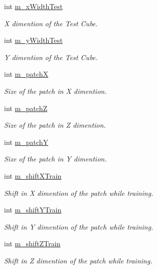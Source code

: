 \begin{DoxyCompactItemize}
int \hyperlink{classDataReader_a3b70edeb59564609bc13d11761586225}{m\+\_\+x\+Width\+Test}
\begin{DoxyCompactList}\small\item\em X dimention of the Test Cube. \end{DoxyCompactList}\item 
int \hyperlink{classDataReader_ac8debe3d06ff92d1d57e90bb5d18a812}{m\+\_\+y\+Width\+Test}
\begin{DoxyCompactList}\small\item\em Y dimention of the Test Cube. \end{DoxyCompactList}\item 
int \hyperlink{classDataReader_a95d075ccc3b12ec30a97d6664642efc2}{m\+\_\+patchX}
\begin{DoxyCompactList}\small\item\em Size of the patch in X dimention. \end{DoxyCompactList}\item 
int \hyperlink{classDataReader_a68b54683e0e0581e3dd76874ea5b6941}{m\+\_\+patchZ}
\begin{DoxyCompactList}\small\item\em Size of the patch in Z dimention. \end{DoxyCompactList}\item 
int \hyperlink{classDataReader_aed3b404cf78c6973363402e5e871e46a}{m\+\_\+patchY}
\begin{DoxyCompactList}\small\item\em Size of the patch in Y dimention. \end{DoxyCompactList}\item 
int \hyperlink{classDataReader_a6d2cc22f742392bafb485fe0f07b13e8}{m\+\_\+shift\+X\+Train}
\begin{DoxyCompactList}\small\item\em Shift in X dimention of the patch while training. \end{DoxyCompactList}\item 
int \hyperlink{classDataReader_a2d564c01ed2225f2c853063113ef87b8}{m\+\_\+shift\+Y\+Train}
\begin{DoxyCompactList}\small\item\em Shift in Y dimention of the patch while training. \end{DoxyCompactList}\item 
int \hyperlink{classDataReader_a0edec69c662462ca0189a5a47a567596}{m\+\_\+shift\+Z\+Train}
\begin{DoxyCompactList}\small\item\em Shift in Z dimention of the patch while training. \end{DoxyCompactList}\item 

\end{DoxyCompactItemize}
